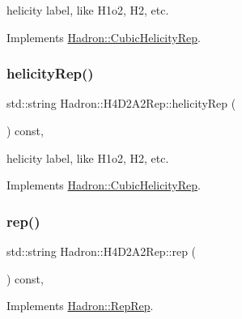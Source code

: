 helicity label, like H1o2, H2, etc. 

Implements \mbox{\hyperlink{structHadron_1_1CubicHelicityRep_af1096946b7470edf0a55451cc662f231}{Hadron\+::\+Cubic\+Helicity\+Rep}}.

\mbox{\label{structHadron_1_1H4D2A2Rep_acefae4ce29aeb8f45ae4976209500037}} 
\subsubsection{\texorpdfstring{helicityRep()}{helicityRep()}\hspace{0.1cm}{\footnotesize\ttfamily [2/2]}}
{\footnotesize\ttfamily std\+::string Hadron\+::\+H4\+D2\+A2\+Rep\+::helicity\+Rep (\begin{DoxyParamCaption}{ }\end{DoxyParamCaption}) const\hspace{0.3cm}{\ttfamily [inline]}, {\ttfamily [virtual]}}

helicity label, like H1o2, H2, etc. 

Implements \mbox{\hyperlink{structHadron_1_1CubicHelicityRep_af1096946b7470edf0a55451cc662f231}{Hadron\+::\+Cubic\+Helicity\+Rep}}.

\mbox{\label{structHadron_1_1H4D2A2Rep_a144c2d98d82e71971a810610f10199d3}} 
\subsubsection{\texorpdfstring{rep()}{rep()}\hspace{0.1cm}{\footnotesize\ttfamily [1/3]}}
{\footnotesize\ttfamily std\+::string Hadron\+::\+H4\+D2\+A2\+Rep\+::rep (\begin{DoxyParamCaption}{ }\end{DoxyParamCaption}) const\hspace{0.3cm}{\ttfamily [inline]}, {\ttfamily [virtual]}}



Implements \mbox{\hyperlink{structHadron_1_1RepRep_ab3213025f6de249f7095892109575fde}{Hadron\+::\+Rep\+Rep}}.

\mbox{\label{structHadron_1_1H4D2A2Rep_a144c2d98d82e71971a810610f10199d3}} 
